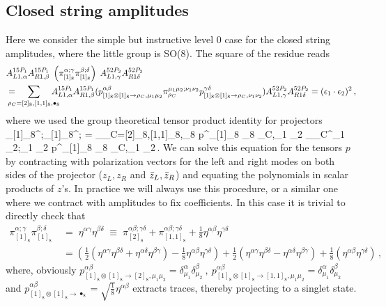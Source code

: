 \subsection{Closed string amplitudes}
Here we consider the simple but instructive level 0 case for the closed string amplitudes, where the little group is SO(8). The square of the residue reads
	\begin{align}
\label{eq:level0_closed_so8}
		{}&A^{15P_1}_{L1, \alpha}A^{15P_1}_{R1,\beta} \; \left( \pi_{[1]_8}^{\alpha ;\gamma}\pi_{[1]_8}^{\beta ;\delta} \right) \;  A^{52P_2}_{L1,\gamma}A^{52P_2}_{R1\delta}     \\
		&= \hspace{-.4cm} \sum_{\rho_C=[2]_8,[1,1]_8,\bullet_8} \hspace{-.4cm}   A^{15P_1}_{L1, \alpha}A^{15P_1}_{R1,\beta}(
		p^{\alpha \beta}_{[1]_8 \otimes [1]_8 \to \rho_C,\mu_1 \mu_2}
		\pi_{\rho_C}^{\mu_1 \mu_2;\nu_1 \nu_2}
		p^{\gamma \delta}_{[1]_8 \otimes [1]_8 \to \rho_C,\nu_1 \nu_2})A^{52P_2}_{L1,\gamma}A^{52P_2}_{R1\delta}
		= (\epsilon_1\cdot \epsilon_2)^2  \,,
\nonumber
\end{align}
where we used the group theoretical tensor product identity for projectors
	\beq
	 	\pi_{[1]_8}^{\alpha ;\gamma}\pi_{[1]_8}^{\beta ;\delta} \; = \sum_{\rho_C=[2]_8,[1,1]_8,\bullet_8} p^{\alpha \beta}_{[1]_8 \otimes [1]_8 \to \rho_C,\mu_1 \mu_2}
	 	\pi_{\rho_C}^{\mu_1 \mu_2;\nu_1 \nu_2}
	 	p^{\gamma \delta}_{[1]_8 \otimes [1]_8 \to \rho_C,\nu_1 \nu_2}\,.
	\eeq
We can solve this equation for the tensors $p$ by contracting with polarization vectors for the left and right modes on both sides of the projector ($z_L,z_R$ and $\bar{z}_L,\bar{z}_R$) and equating the polynomials in scalar products of $z$'s. In practice we will always use this procedure, or a similar one where we contract with amplitudes to fix coefficients. In this case it is trivial to directly check that
	\begin{align}
		\pi_{[1]_8}^{\alpha ;\gamma}\pi_{[1]_8}^{\beta ;\delta} \; 
		&= \; \eta^{\alpha \gamma}\eta^{\beta \delta}	\;\equiv \;  \pi_{[2]_8}^{\alpha \beta;\gamma \delta} + \pi_{[1,1]_8}^{\alpha \beta;\gamma \delta} + \frac{1}{8} \eta^{\alpha \beta} \eta^{\gamma \delta}
	\label{eq:level0_closed_check}
	       \\
		& = \left(\frac{1}{2}( \eta^{\alpha \gamma}\eta^{\beta \delta}+\eta^{\alpha \delta}\eta^{\beta \gamma})-\frac{1}{8} \eta^{\alpha \beta}\eta^{\gamma \delta}\right) 
		+ \frac{1}{2}(\eta^{\alpha \gamma}\eta^{\beta \delta}-\eta^{\alpha \delta}\eta^{\beta \gamma}) + \frac{1}{8}(\eta^{\alpha \beta}\eta^{\gamma \delta})\,,
	\nonumber
\end{align}
where, obviously $p^{\alpha \beta}_{[1]_8 \otimes [1]_8 \to [2]_8,\mu_1 \mu_2}=\delta^\alpha_{\mu_1}\delta^\beta_{\mu_2} ~,~p^{\alpha \beta}_{[1]_8 \otimes [1]_8 \to [1,1]_8,\mu_1 \mu_2}=\delta^\alpha_{\mu_1}\delta^\beta_{\mu_2}$ and $p^{\alpha \beta}_{[1]_8 \otimes [1]_8 \to \bullet_8}= \sqrt{\frac{1 }{8}}\eta^{\alpha\beta}$ extracts traces, thereby projecting to a singlet state.
